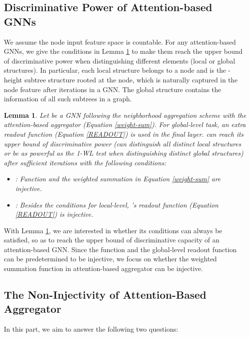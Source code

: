 \documentclass[letterpaper]{article} \usepackage{aaai20}  \usepackage{times}  \usepackage{helvet} \usepackage{courier}  \usepackage[hyphens]{url}  \usepackage{graphicx} \urlstyle{rm} \def\UrlFont{\rm}  \usepackage{graphicx}  \frenchspacing  \setlength{\pdfpagewidth}{8.5in}  \setlength{\pdfpageheight}{11in}
\theoremstyle{plain}
\newtheorem{lemma}{Lemma}
\theoremstyle{definition}
\begin{document}
\subsection{Discriminative Power of Attention-based GNNs}

We assume the node input feature space is countable. For any attention-based GNNs, we give the conditions in Lemma \ref{lemma:condition} to make them reach the upper bound of discriminative power when distinguishing different elements (local or global structures). In particular, each local structure belongs to a node and is the -height subtree structure rooted at the node, which is naturally captured in the node feature  after  iterations in a GNN. The global structure contains the information of all such subtrees in a graph.

\begin{lemma} \label{lemma:condition}
Let  be a GNN following the neighborhood aggregation scheme with the attention-based aggregator (Equation \ref{weight-sum}). For global-level task, an extra readout function (Equation \ref{READOUT}) is used in the final layer.  can reach its upper bound of discriminative power (can distinguish all distinct local structures or be as powerful as the 1-WL test when distinguishing distinct global structures) after sufficient iterations with the following conditions:
\begin{itemize}
\item : Function  and the weighted summation in Equation \ref{weight-sum} are injective.
\item : Besides the conditions for local-level, 's readout function (Equation \ref{READOUT}) is injective.
\end{itemize}
\end{lemma}

With Lemma \ref{lemma:condition}, we are interested in whether its conditions can always be satisfied, so as to reach the upper bound of discriminative capacity of an attention-based GNN. Since the function  and the global-level readout function can be predetermined to be injective, we focus on whether the weighted summation function in attention-based aggregator can be injective.

\subsection{The Non-Injectivity of Attention-Based Aggregator}\label{Examples}

In this part, we aim to answer the following two questions:
\end{document}
